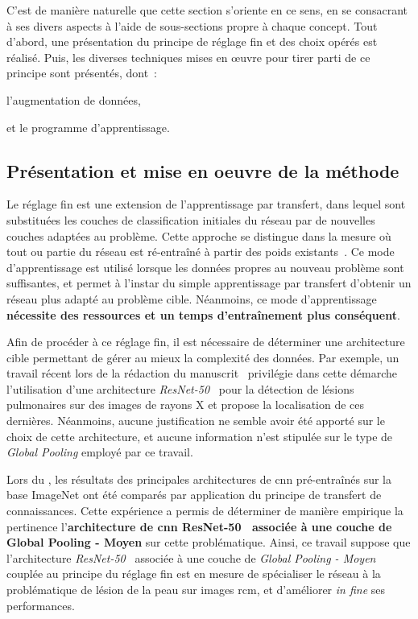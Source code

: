 C'est de manière naturelle que cette section s'oriente en ce sens, en se consacrant à ses divers aspects à l'aide de sous-sections propre à chaque concept. Tout d'abord, une présentation du principe de réglage fin et des choix opérés est réalisé. Puis, les diverses techniques mises en œuvre pour tirer parti de ce principe sont présentés, dont~:
\begin{inlinerate}
    \item l'augmentation de données,
    \item et le programme d'apprentissage.
\end{inlinerate}\par

\subsection{Présentation et mise en oeuvre de la méthode}
Le réglage fin est une extension de l'apprentissage par transfert, dans lequel sont substituées les couches de classification initiales du réseau par de nouvelles couches adaptées au problème. Cette approche se distingue dans la mesure où tout ou partie du réseau est ré-entraîné à partir des poids existants~\cite{Tajbakhsh2016}. Ce mode d'apprentissage est utilisé lorsque les données propres au nouveau problème sont suffisantes, et permet à l'instar du simple apprentissage par transfert d'obtenir un réseau plus adapté au problème cible. Néanmoins, ce mode d'apprentissage \textbf{nécessite des ressources et un temps d'entraînement plus conséquent}.\par

Afin de procéder à ce réglage fin, il est nécessaire de déterminer une architecture cible permettant de gérer au mieux la complexité des données. Par exemple, un travail récent lors de la rédaction du manuscrit~\cite{Park2019} privilégie dans cette démarche l'utilisation d'une architecture \textit{ResNet-50}~\cite{He2016} pour la détection de lésions pulmonaires sur des images de rayons X et propose la localisation de ces dernières. Néanmoins, aucune justification ne semble avoir été apporté sur le choix de cette architecture, et aucune information n'est stipulée sur le type de \textit{Global Pooling} employé par ce travail.\par

Lors du , les résultats des principales architectures de \gls{cnn} pré-entraînés sur la base ImageNet ont été comparés par application du principe de transfert de connaissances. Cette expérience a permis de déterminer de manière empirique la pertinence l'\textbf{architecture de \gls{cnn} ResNet-50~\cite{He2016} associée à une couche de Global Pooling - Moyen} sur cette problématique. Ainsi, ce travail suppose que l'architecture \textit{ResNet-50}~\cite{He2016} associée à une couche de \textit{Global Pooling - Moyen} couplée au principe du réglage fin est en mesure de spécialiser le réseau à la problématique de lésion de la peau sur images \gls{rcm}, et d'améliorer \textit{in fine} ses performances.\par

